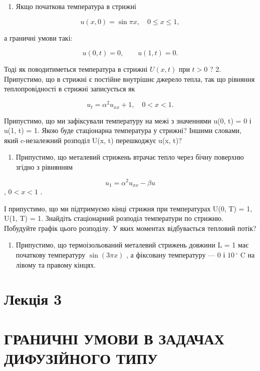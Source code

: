 \documentclass[
  ukrainian,
]{article}
\providecommand{\tightlist}{%
  \setlength{\itemsep}{0pt}\setlength{\parskip}{0pt}}
\begin{document}
\begin{enumerate}
\def\labelenumi{\arabic{enumi}.}
\tightlist
\item
  Якщо початкова температура в стрижні
\end{enumerate}

\[u(x, 0) = \sin \pi x, \quad 0 \leqslant x \leqslant 1,\]

а граничні умови такі:

\[
u(0, t) = 0, \qquad u(1, t) = 0.
\]

Тоді як поводитиметься температура в стрижні \(U(x, t)\) при \(t > 0\) ?
2. Припустимо, що в стрижні є постійне внутрішнє джерело тепла, так що
рівняння теплопровідності в стрижні записується як

\[u_t = \alpha^2 u_{xx} + 1, \quad 0 < x < 1.\]

Припустимо, що ми зафіксували температуру на межі з значеннями u(0, t) =
0 і u(1, t) = 1. Якою буде стаціонарна температура у стрижні? Іншими
словами, який c-незалежний розподіл U(x, t) перешкоджує u(x, t)?

\begin{enumerate}
\def\labelenumi{\arabic{enumi}.}
\setcounter{enumi}{2}
\tightlist
\item
  Припустимо, що металевий стрижень втрачає тепло через бічну поверхню
  згідно з рівнянням
\end{enumerate}

\[u_1 = \alpha^2 u_{xx} - \beta u\], \(0 < x < 1\) .

І припустимо, що ми підтримуємо кінці стрижня при температурах U(0, T) =
1, U(1, T) = 1. Знайдіть стаціонарний розподіл температури по стрижню.
Побудуйте графік цього розподілу. У яких моментах відбувається тепловий
потік?

\begin{enumerate}
\def\labelenumi{\arabic{enumi}.}
\setcounter{enumi}{3}
\tightlist
\item
  Припустимо, що термоізольований металевий стрижень довжини L = 1 має
  початкову температуру \(\sin(3\pi x)\) , а фіксовану температуру --- 0
  і \(10\,^{\circ}\) C на лівому та правому кінцях.
\end{enumerate}

\section{Лекція 3}\label{ux43bux435ux43aux446ux456ux44f-3}

\section{ГРАНИЧНІ УМОВИ В ЗАДАЧАХ ДИФУЗІЙНОГО
ТИПУ}\label{ux433ux440ux430ux43dux438ux447ux43dux456-ux443ux43cux43eux432ux438-ux432-ux437ux430ux434ux430ux447ux430ux445-ux434ux438ux444ux443ux437ux456ux439ux43dux43eux433ux43e-ux442ux438ux43fux443}
\end{document}
